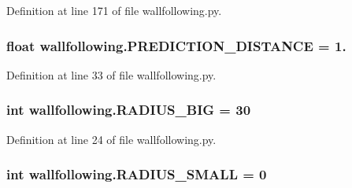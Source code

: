 Definition at line 171 of file wallfollowing.\+py.

\subsubsection[{\texorpdfstring{P\+R\+E\+D\+I\+C\+T\+I\+O\+N\+\_\+\+D\+I\+S\+T\+A\+N\+CE}{PREDICTION_DISTANCE}}]{\setlength{\rightskip}{0pt plus 5cm}float wallfollowing.\+P\+R\+E\+D\+I\+C\+T\+I\+O\+N\+\_\+\+D\+I\+S\+T\+A\+N\+CE = 1.}\hypertarget{namespacewallfollowing_a40e67d731c86a71ce7d1b8c17bff0514}{}\label{namespacewallfollowing_a40e67d731c86a71ce7d1b8c17bff0514}


Definition at line 33 of file wallfollowing.\+py.

\subsubsection[{\texorpdfstring{R\+A\+D\+I\+U\+S\+\_\+\+B\+IG}{RADIUS_BIG}}]{\setlength{\rightskip}{0pt plus 5cm}int wallfollowing.\+R\+A\+D\+I\+U\+S\+\_\+\+B\+IG = 30}\hypertarget{namespacewallfollowing_a4b502375f79f9fcc2a823cc60da7bee0}{}\label{namespacewallfollowing_a4b502375f79f9fcc2a823cc60da7bee0}


Definition at line 24 of file wallfollowing.\+py.

\subsubsection[{\texorpdfstring{R\+A\+D\+I\+U\+S\+\_\+\+S\+M\+A\+LL}{RADIUS_SMALL}}]{\setlength{\rightskip}{0pt plus 5cm}int wallfollowing.\+R\+A\+D\+I\+U\+S\+\_\+\+S\+M\+A\+LL = 0}\hypertarget{namespacewallfollowing_aa59c6dfd10cb4f1550367b3268417436}{}\label{namespacewallfollowing_aa59c6dfd10cb4f1550367b3268417436}


